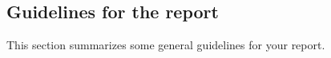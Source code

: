 \documentclass[11pt,a4paper]{article}
\begin{document}

%


\subsection*{Guidelines for the report}

This section summarizes some general guidelines for your report.
\end{document}
